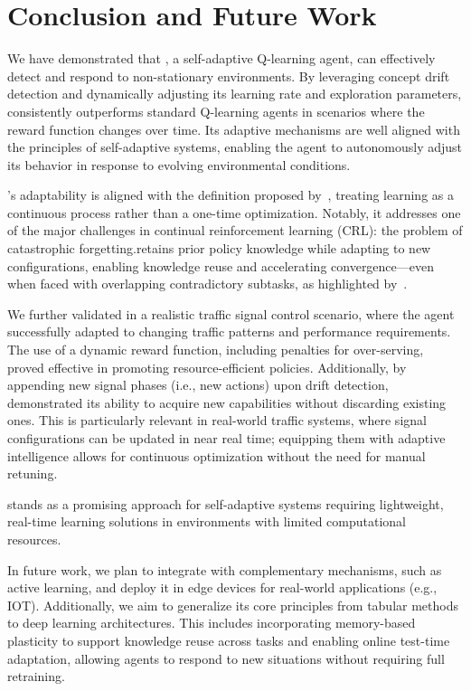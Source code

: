 
\section{Conclusion and Future Work}
\label{sec:conclusion}
We have demonstrated that \adaptiverl, a self-adaptive Q-learning agent, can effectively detect and respond to non-stationary environments. By leveraging concept drift detection and dynamically adjusting its learning rate and exploration parameters, \adaptiverl consistently outperforms standard Q-learning agents in scenarios where the reward function changes over time. Its adaptive mechanisms are well aligned with the principles of self-adaptive systems, enabling the agent to autonomously adjust its behavior in response to evolving environmental conditions.

\adaptiverl's adaptability is aligned with the definition proposed by~\citet{abel2023definitioncontinualreinforcementlearning}, treating learning as a continuous process rather than a one-time optimization. Notably, it addresses one of the major challenges in continual reinforcement learning (CRL): the problem of catastrophic forgetting.\adaptiverl retains prior policy knowledge while adapting to new configurations, enabling knowledge reuse and accelerating convergence—even when faced with overlapping contradictory subtasks, as highlighted by~\citet{Bagus2022}.

We further validated \adaptiverl in a realistic traffic signal control scenario, where the agent successfully adapted to changing traffic patterns and performance requirements. The use of a dynamic reward function, including penalties for over-serving, proved effective in promoting resource-efficient policies. Additionally, by appending new signal phases (i.e., new actions) upon drift detection, \adaptiverl demonstrated its ability to acquire new capabilities without discarding existing ones. This is particularly relevant in real-world traffic systems, where signal configurations can be updated in near real time; equipping them with adaptive intelligence allows for continuous optimization without the need for manual retuning.

\adaptiverl stands as a promising approach for self-adaptive systems requiring lightweight, real-time learning solutions in environments with limited computational resources.

In future work, we plan to integrate \adaptiverl with complementary mechanisms, such as active learning, and deploy it in edge devices for real-world applications (e.g., \ac{IOT}). Additionally, we aim to generalize its core principles from tabular methods to deep learning architectures. This includes incorporating memory-based plasticity to support knowledge reuse across tasks and enabling online test-time adaptation, allowing agents to respond to new situations without requiring full retraining.

